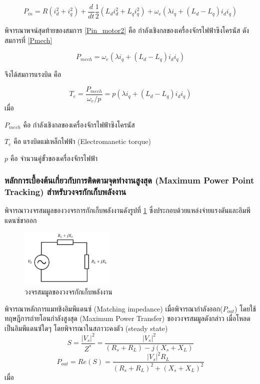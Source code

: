 \documentclass[11pt,a4paper]{article}
\begin{document}
\begin{equation}\label{Pin_motor2}
    P_{in} = R(i_{d}^2 +i_{q}^2) + \frac{d}{dt} \frac{1}{2} (L_{d}i_{d}^2 + L_{q}i_{q}^2) + \omega_{e}(\lambda i_{q} + (L_{d} - L_{q})i_{d}i_{q} )
\end{equation}

พิจารณาพจน์สุดท้ายของสมการ \ref{Pin_motor2} คือ กำลังเชิงกลของเครื่องจักรไฟฟ้าซิงโครนัส ดังสมการที่ \ref{Pmech}

\begin{equation}\label{Pmech}
    P_{mech} =  \omega_{e}(\lambda i_{q} + (L_{d} - L_{q})i_{d}i_{q} )
\end{equation}

จึงได้สมการแรงบิด คือ

\begin{equation}\label{Pmech}
    T_{e} = \frac{P_{mech}}{ \omega_{e}/p } =  p(\lambda i_{q} + (L_{d} - L_{q})i_{d}i_{q} )
\end{equation}
เมื่อ

$P_{mech}$ คือ กำลังเชิงกลของเครื่องจักรไฟฟ้าซิงโครนัส

$T_{e}$ คือ แรงบิดแม่เหล็กไฟฟ้า (Electromanetic torque)

$p$ คือ จำนวนคู่ขั้วของเครื่องจักรไฟฟ้า

\subsubsection{หลักการเบื้องต้นเกี่ยวกับการติดตามจุดทำงานสูงสุด (Maximum Power Point Tracking) สำหรับวงจรกักเก็บพลังงาน}

พิจารณาวงจรสมมูลของวงจรการกักเก็บพลังงานดังรูปที่ \ref{genpath_elec_cir} ซึ่งประกอบด้วยแหล่งจ่ายแรงดันและอิมพีแดนซ์ขาออก
\begin{figure}[H]
    \begin{center}
        \includegraphics[width=0.4\textwidth]{genpath_elec_cir.jpg}
    \end{center}
    \caption{วงจรสมมูลของวงจรกักเก็บพลังงาน \cite{MPPT}}
    \label{genpath_elec_cir}
\end{figure}
พิจารณาหลักการแมทชิงอิมพีแดนซ์ (Matching impedance) เมื่อพิจารณากำลังออก($P_{out}$) โดยใช้ทฤษฎีการถ่ายโอนกำลังสูงสุด (Maximum Power Transfer) ของวงจรสมมูลดังกล่าว เมื่อโหลดเป็นอิมพีแดนซ์ใดๆ โดยพิจารณาในสภาวะคงตัว (steady state)
\begin{equation}
    S = \frac{|V_{s}|^2 }{ Z^{*} } = \frac{|V_{s}|^2 }{ (R_{s} + R_{L}) - j(X_{s} + X_{L} )  }
\end{equation}
\begin{equation}\label{Pout1}
    P_{out} = Re(S) = \frac{|V_{s}|^2 R_{L} }{ (R_{s} + R_{L})^2 + (X_{s} + X_{L} )^2  }
\end{equation}
เมื่อ
\end{document}
